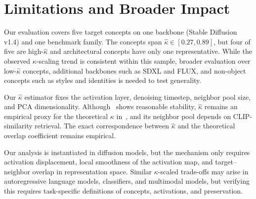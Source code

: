 \section{Limitations and Broader Impact}
\label{sec:limitations}

Our evaluation covers five target concepts on one backbone (Stable Diffusion v1.4) and one benchmark family. The concepts span $\hat\kappa \in [0.27, 0.89]$, but four of five are high-$\hat\kappa$ and architectural concepts have only one representative. While the observed $\kappa$-scaling trend is consistent within this sample, broader evaluation over low-$\hat\kappa$ concepts, additional backbones such as SDXL and FLUX, and non-object concepts such as styles and identities is needed to test generality.

Our $\hat\kappa$ estimator fixes the activation layer, denoising timestep, neighbor pool size, and PCA dimensionality. Although~ shows reasonable stability, $\hat\kappa$ remains an empirical proxy for the theoretical $\kappa$ in~, and its neighbor pool depends on CLIP-similarity retrieval. The exact correspondence between $\hat\kappa$ and the theoretical overlap coefficient remains empirical.

Our analysis is instantiated in diffusion models, but the mechanism only requires activation displacement, local smoothness of the activation map, and target--neighbor overlap in representation space. Similar $\kappa$-scaled trade-offs may arise in autoregressive language models, classifiers, and multimodal models, but verifying this requires task-specific definitions of concepts, activations, and preservation.
